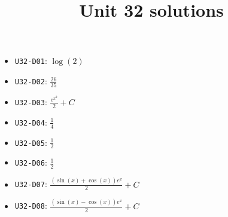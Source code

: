 \title{Unit 32 solutions}\maketitle\begin{itemize}
  \item \texttt{U32-D01}: $\log{\left(2 \right)}$
  \item \texttt{U32-D02}: $\frac{26}{35}$
  \item \texttt{U32-D03}: $\frac{e^{x^{2}}}{2}+C$
  \item \texttt{U32-D04}: $\frac{1}{4}$
  \item \texttt{U32-D05}: $\frac{1}{2}$
  \item \texttt{U32-D06}: $\frac{1}{2}$
  \item \texttt{U32-D07}: $\frac{\left(\sin{\left(x \right)} + \cos{\left(x \right)}\right) e^{x}}{2}+C$
  \item \texttt{U32-D08}: $\frac{\left(\sin{\left(x \right)} - \cos{\left(x \right)}\right) e^{x}}{2}+C$
\end{itemize}
